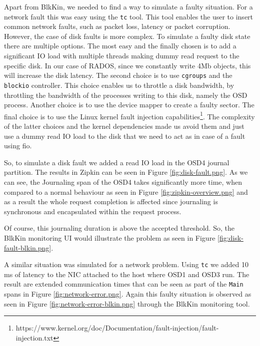 Apart from BlkKin, we needed to find a way to simulate a faulty situation. For a
network fault this was easy using the \texttt{tc} tool. This tool enables the
user to insert common network faults, such as packet loss, latency or packet
corruption. However, the case of disk faults is more complex. To simulate a
faulty disk state there are multiple options. The most easy and the finally
chosen is to add a significant IO load with multiple threads making dummy read
request to the specific disk. In our case of RADOS, since we constantly write
4Mb objects, this will increase the disk latency. The second choice is to use
\texttt{cgroups} and the \texttt{blockio} controller. This choice enables us to
throttle a disk bandwidth, by throttling the bandwidth of the processes writing
to this disk, namely the OSD process. Another choice is to use the device mapper
to create a faulty sector. The final choice is to use the Linux kernel fault
injection
capabilities\footnote{https://www.kernel.org/doc/Documentation/fault-injection/fault-injection.txt}.
The complexity of the latter choices and the kernel dependencies made us avoid
them and just use a dummy read IO load to the disk that we need to act as in
case of a fault using fio.

So, to simulate a disk fault we added a read IO load in the OSD4 journal
partition. The results in Zipkin can be seen in Figure \ref{fig:disk-fault.png}.
As we can see, the Journaling span of the OSD4 takes significantly more time,
when compared to a normal behaviour as seen in Figure
\ref{fig:zipkin-overview.png} and as a result the whole request completion is
affected since journaling is synchronous and encapsulated within the request
process. 


Of course, this journaling duration is above the accepted threshold. So, the
BlkKin monitoring UI would illustrate the problem as seen in Figure
\ref{fig:disk-fault-blkin.png}.


A similar situation was simulated for a network problem. Using \texttt{tc} we
added 10 ms of latency to the NIC attached to the host where OSD1 and OSD3 run.
The result are extended communication times that can be seen as part of the
\texttt{Main} spans in Figure \ref{fig:network-error.png}. Again this faulty
situation is observed as seen in Figure \ref{fig:network-error-blkin.png}
through the BlkKin monitoring tool.

